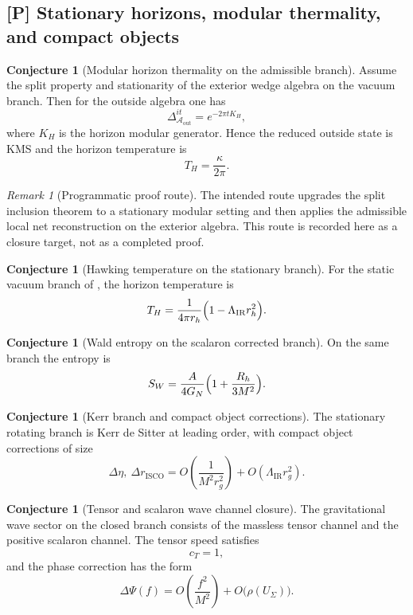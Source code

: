 \documentclass[11pt,a4paper]{article}
\theoremstyle{definition}
\newtheorem{conjecture}[theorem]{Conjecture}
\theoremstyle{remark}
\newtheorem*{remark}{Remark}
\begin{document}
\subsection{[P] Stationary horizons, modular thermality, and compact objects}

\begin{conjecture}[Modular horizon thermality on the admissible branch]
\label{thm:modular_horizon_thermality}
Assume the split property and stationarity of the exterior wedge algebra on the vacuum branch. Then
for the outside algebra one has
\[
\Delta_{\mathcal A_{\mathrm{out}}}^{it}=e^{-2\pi t K_H},
\]
where \(K_H\) is the horizon modular generator. Hence the reduced outside state is KMS and the
horizon temperature is
\[
T_H=\frac{\kappa}{2\pi}.
\]
\end{conjecture}

\begin{remark}[Programmatic proof route]
The intended route upgrades the split inclusion theorem  to a
stationary modular setting and then applies the admissible local net reconstruction on the exterior
algebra. This route is recorded here as a closure target, not as a completed proof.
\end{remark}

\begin{conjecture}[Hawking temperature on the stationary branch]
\label{cor:hawking_temperature_stationary_branch}
For the static vacuum branch of
, the horizon temperature is
\[
T_H=\frac{1}{4\pi r_h}\Bigl(1-\Lambda_{\mathrm{IR}}r_h^2\Bigr).
\]
\end{conjecture}

\begin{conjecture}[Wald entropy on the scalaron corrected branch]
\label{prop:wald_entropy_scalaron_branch}
On the same branch the entropy is
\[
S_W=\frac{A}{4G_N}\Bigl(1+\frac{R_h}{3M^2}\Bigr).
\]
\end{conjecture}

\begin{conjecture}[Kerr branch and compact object corrections]
\label{prop:kerr_compact_object_corrections}
The stationary rotating branch is Kerr de Sitter at leading order, with compact object corrections
of size
\[
\Delta\eta,\ \Delta r_{\mathrm{ISCO}}
=
O\!\left(\frac{1}{M^2r_g^2}\right)+O(\Lambda_{\mathrm{IR}}r_g^2).
\]
\end{conjecture}

\begin{conjecture}[Tensor and scalaron wave channel closure]
\label{thm:tensor_scalaron_wave_channel_closure}
The gravitational wave sector on the closed branch consists of the massless tensor channel and the
positive scalaron channel. The tensor speed satisfies
\[
c_T=1,
\]
and the phase correction has the form
\[
\Delta\Psi(f)=O\!\left(\frac{f^2}{M^2}\right)+O\bigl(\rho(U_\Sigma)\bigr).
\]
\end{conjecture}
\end{document}
